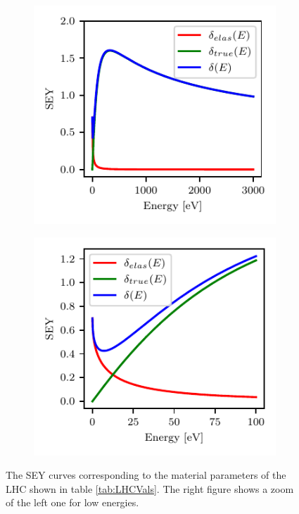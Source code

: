 \begin{figure}
     \centering
    \begin{subfigure}[b]{0.4\textwidth}
        \hspace*{-1cm}
        \centering
        \includegraphics{chapters/Chapter1/Figures/SEY_components.pdf}
    \end{subfigure}
    \hfill
    \begin{subfigure}[b]{0.4\textwidth}
        \hspace*{-1cm}
        \centering
        \includegraphics{chapters/Chapter1/Figures/SEY_components_zoom.pdf}
    \end{subfigure}
    \caption{The SEY curves corresponding to the material parameters of the LHC shown in table \ref{tab:LHCVals}. The right figure shows a zoom of the left one for low energies.}
    \label{fig:SEYcurves}
\end{figure}
